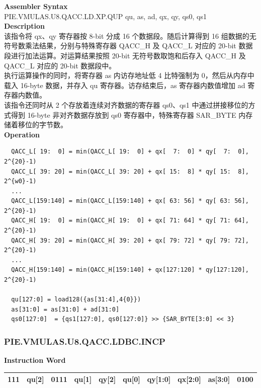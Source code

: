 \textbf{Assembler Syntax} \\
PIE.VMULAS.U8.QACC.LD.XP.QUP qu, as, ad, qx, qy, qs0, qs1 \\
\textbf{Description} \\
该指令将 qx、qy 寄存器按 8-bit 分成 16 个数据段。随后计算得到 16 组数据的无符号数乘法结果，分别与特殊寄存器 QACC\_H 及 QACC\_L 对应的 20-bit 数据段进行加法运算。对运算结果按照 20-bit 无符号数取饱和后存入 QACC\_H 及 QACC\_L 对应的 20-bit 数据段中。\\
执行运算操作的同时，将寄存器 as 内访存地址低 4 比特强制为 0，然后从内存中载入 16-byte 数据，并存入 qu 寄存器。访存结束后，as 寄存器内数值增加 ad 寄存器内数值。\\
该指令还同时从 2 个存放着连续对齐数据的寄存器 qs0、qs1 中通过拼接移位的方式得到 16-byte 非对齐数据存放到 qs0 寄存器中，特殊寄存器 SAR\_BYTE 内存储着移位的字节数。\\
\textbf{Operation}
\begin{lstlisting}
  QACC_L[ 19:  0] = min(QACC_L[ 19:  0] + qx[  7:  0] * qy[  7:  0], 2^{20}-1)
  QACC_L[ 39: 20] = min(QACC_L[ 39: 20] + qx[ 15:  8] * qy[ 15:  8], 2^{w0}-1)
  ...
  QACC_L[159:140] = min(QACC_L[159:140] + qx[ 63: 56] * qy[ 63: 56], 2^{20}-1)
  QACC_H[ 19:  0] = min(QACC_H[ 19:  0] + qx[ 71: 64] * qy[ 71: 64], 2^{20}-1)
  QACC_H[ 39: 20] = min(QACC_H[ 39: 20] + qx[ 79: 72] * qy[ 79: 72], 2^{20}-1)
  ...
  QACC_H[159:140] = min(QACC_H[159:140] + qx[127:120] * qy[127:120], 2^{20}-1)

  qu[127:0] = load128({as[31:4],4{0}})
  as[31:0] = as[31:0] + ad[31:0]
  qs0[127:0]  = {qs1[127:0], qs0[127:0]} >> {SAR_BYTE[3:0] << 3}
\end{lstlisting}

\newpage
\subsubsection{PIE.VMULAS.U8.QACC.LDBC.INCP}\label{instruction:PIEVMULASU8QACCLDBCINCP}
\setlength\tabcolsep{6pt}
\textbf{Instruction Word} \\
\begin{tabular}{|c|c|c|c|c|c|c|c|c|c|}
	\hline
	111 & qu[2] & 0111 & qu[1] & qy[2] & qu[0] & qy[1:0] & qx[2:0] & as[3:0] & 0100 \\
	\hline
\end{tabular}

